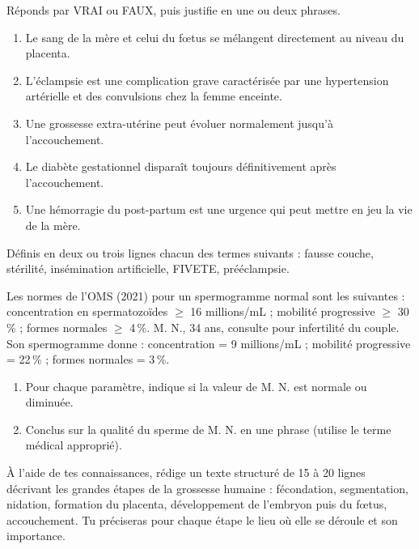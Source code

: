 \documentclass[11pt]{article}
\newcommand{\cle}[1]{{\popxbold\color{popdark}#1}}
\newcounter{popsec}
\newcounter{popsub}
\newcommand{\courssub}[1]{%
  \stepcounter{popsub}%
  \par\vspace{9pt}\noindent{\popxbold\fontsize{11.5}{13}\selectfont\color{popink}{\color{poporange}\thepopsec.\thepopsub}\hspace{6pt}#1}\par\nopagebreak\vspace{4pt}
}
\begin{document}
\begin{exercice}
Réponds par VRAI ou FAUX, puis justifie en une ou deux phrases.
\begin{enumerate}
\item Le sang de la mère et celui du fœtus se mélangent directement au niveau du placenta.
\item L'éclampsie est une complication grave caractérisée par une hypertension artérielle et des convulsions chez la femme enceinte.
\item Une grossesse extra-utérine peut évoluer normalement jusqu'à l'accouchement.
\item Le diabète gestationnel disparaît toujours définitivement après l'accouchement.
\item Une hémorragie du post-partum est une urgence qui peut mettre en jeu la vie de la mère.
\end{enumerate}
\end{exercice}

\begin{exercice}
Définis en deux ou trois lignes chacun des termes suivants : \cle{fausse couche}, \cle{stérilité}, \cle{insémination artificielle}, \cle{FIVETE}, \cle{prééclampsie}.
\end{exercice}

\begin{exercice}
Les normes de l'OMS (2021) pour un spermogramme normal sont les suivantes : concentration en spermatozoïdes $\ge$ 16 millions/mL ; mobilité progressive $\ge$ 30\,\% ; formes normales $\ge$ 4\,\%.
M. N., 34 ans, consulte pour infertilité du couple. Son spermogramme donne : concentration = 9 millions/mL ; mobilité progressive = 22\,\% ; formes normales = 3\,\%.
\begin{enumerate}
\item Pour chaque paramètre, indique si la valeur de M. N. est normale ou diminuée.
\item Conclus sur la qualité du sperme de M. N. en une phrase (utilise le terme médical approprié).
\end{enumerate}
\end{exercice}

\courssub{Je m'entraîne}

\begin{exercice}
À l'aide de tes connaissances, rédige un texte structuré de 15 à 20 lignes décrivant les grandes étapes de la grossesse humaine : fécondation, segmentation, nidation, formation du placenta, développement de l'embryon puis du fœtus, accouchement. Tu préciseras pour chaque étape le lieu où elle se déroule et son importance.
\end{exercice}
\end{document}
